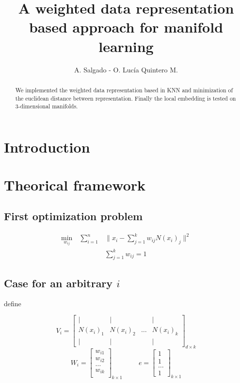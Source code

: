 \documentclass[12pt,journal]{IEEEtran}
\begin{document}
\title{A weighted data representation based approach for manifold learning}
\author{A. Salgado - O. Lucía Quintero M.}
\maketitle

\begin{abstract}
    We implemented the weighted data representation based in KNN and minimization
    of the euclidean distance between representation. Finally the local embedding
    is tested on 3-dimensional manifolds.
\end{abstract}

\section{Introduction}

\section{Theorical framework}

\subsection{First optimization problem}

    \begin{equation*}
        \begin{aligned}
            \underset{w_{ij}}{\text{min}} \quad \sum_{i=1}^n & \lVert x_i - \sum_{j=1}^k w_{ij} N(x_i)_j \rVert^2 \\
            & \sum_{j=1}^k w_{ij} = 1
        \end{aligned}
    \end{equation*}

    \subsection{Case for an arbitrary $i$}

    define

    \[
        V_i = 
        \begin{bmatrix}
            |      &  |     &       & | \\
            N(x_i)_1 & N(x_i)_2 & \dots & N(x_i)_k \\
            |      &  |     &       & |
        \end{bmatrix}_{d \times k}
    \]
    \[
        W_i =
        \begin{bmatrix}
            w_{i1}\\
            w_{i2}\\
            \dots \\
            w_{ik}\\
        \end{bmatrix}_{k \times 1}
        \hspace{1cm}
        e = 
        \begin{bmatrix} 
        1\\
        1\\
        \dots\\
        1
        \end{bmatrix}_{k \times 1}
    \]
\end{document}
